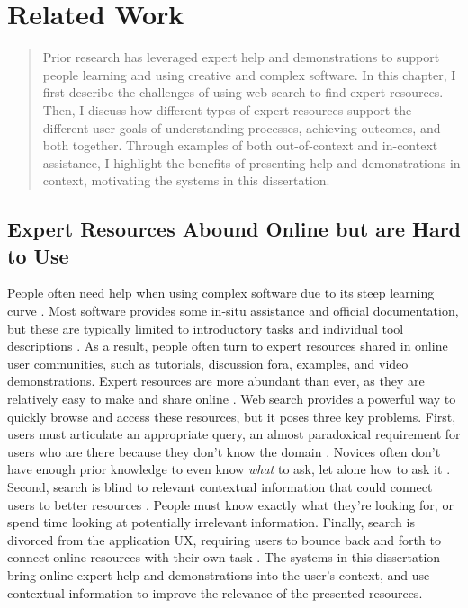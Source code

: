 \chapter{Related Work}
\label{chapter:related_work}
\begin{quote}
Prior research has leveraged expert help and demonstrations to support people learning and using creative and complex software. In this chapter, I first describe the challenges of using web search to find expert resources. Then, I discuss how different types of expert resources support the different user goals of understanding processes, achieving outcomes, and both together. Through examples of both out-of-context and in-context assistance, I highlight the benefits of presenting help and demonstrations in context, motivating the systems in this dissertation.
\end{quote}

\section{Expert Resources Abound Online but are Hard to Use}
People often need help when using complex software due to its steep learning curve \cite{Adar2014}. Most software provides some in-situ assistance and official documentation, but these are typically limited to introductory tasks and individual tool descriptions \cite{Lafreniere2014a}. As a result, people often turn to expert resources shared in online user communities, such as tutorials, discussion fora, examples, and video demonstrations. Expert resources are more abundant than ever, as they are relatively easy to make and share online \cite{Pongnumkul2011, Lafreniere2013a}. Web search provides a powerful way to quickly browse and access these resources, but it poses three key problems. First, users must articulate an appropriate query, an almost paradoxical requirement for users who are there because they don't know the domain \cite{Russell2011}. Novices often don't have enough prior knowledge to even know \textit{what} to ask, let alone how to ask it \cite{Miyake1979}. Second, search is blind to relevant contextual information that could connect users to better resources \cite{Ekstrand2011, Kraft2005, Finkelstein2002}. People must know exactly what they're looking for, or spend time looking at potentially irrelevant information. Finally, search is divorced from the application UX, requiring users to bounce back and forth to connect online resources with their own task \cite{Fourney2014Intertwine}. The systems in this dissertation bring online expert help and demonstrations into the user's context, and use contextual information to improve the relevance of the presented resources.


